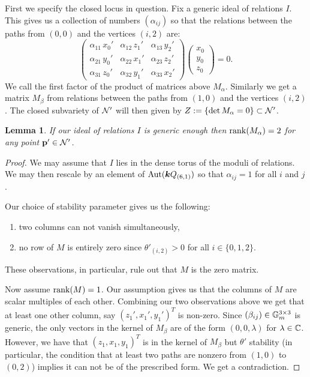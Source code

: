 \documentclass{amsart}
\newtheorem{lem}[thm]{Lemma}
\theoremstyle{definition}
\begin{document}
First we specify the closed locus in question.
Fix a generic ideal of relations $I$.
This gives us a collection of numbers $(\alpha_{ij})$ so that the relations between the paths from $(0,0)$ and the vertices $(i,2)$ are:
\begin{equation}\label{eq:z}
    \begin{pmatrix}
    \alpha_{11}\, x_0' & \alpha_{12}\, z_1' & \alpha_{13}\, y_2' \\
    \alpha_{21}\, y_0' & \alpha_{22}\, x_1' & \alpha_{23}\, z_2' \\
    \alpha_{31}\, z_0' & \alpha_{32}\, y_1' & \alpha_{33}\, x_2'
\end{pmatrix} \begin{pmatrix}
    x_0 \\ y_0 \\ z_0
\end{pmatrix} =0.
\end{equation}
We call the first factor of the product of matrices above $M_\alpha$.
Similarly we get a matrix $M_\beta$ from relations between the paths from $(1,0)$ and the vertices $(i,2)$.
The closed subvariety of $\mathcal{N}'$ will then given by $Z:= \{\operatorname{det} M_\alpha=0\} \subset \mathcal{N}'$.


\begin{lem}\label{lm:rank}
If our ideal of relations $I$ is generic enough then $\operatorname{rank}(M_\alpha) = 2$ for any point $\mathbf{p}' \in \mathcal{N}'$.
\end{lem}

\begin{proof}
We may assume that $I$ lies in the dense torus of the moduli of relations.
We may then rescale by an element of $\text{Aut}({\boldsymbol{k}} Q_{(6,1)})$ so that $\alpha_{ij}=1$ for all $i$ and $j$.

Our choice of stability parameter gives us the following:
\begin{enumerate}
    \item two columns can not vanish simultaneously,
    \item no row of $M$ is entirely zero since $\theta'_{(i,2)}>0$ for all $i \in \{0,1,2\}$.
\end{enumerate}
These observations, in particular, rule out that $M$ is the zero matrix.

Now assume $\operatorname{rank}(M)=1$.
Our assumption gives us that the columns of $M$ are scalar multiples of each other.
Combining our two observations above we get that at least one other column, say $(z_1', x_1', y_1')^T$ is non-zero.
Since $(\beta_{ij}) \in \mathbb{G}_m^{3 \times 3}$ is generic, the only vectors in the kernel of $M_\beta$ are of the form $(0,0,\lambda)$ for $\lambda \in \mathbb{C}$.
However, we have that $(z_1, x_1, y_1)^T$ is in the kernel of $M_\beta$ but $\theta'$ stability (in particular, the condition that at least two paths are nonzero from $(1,0)$ to $(0,2)$) implies it can not be of the prescribed form.
We get a contradiction.
\end{proof}
\end{document}
